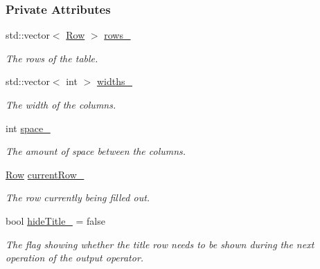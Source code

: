 \subsubsection*{Private Attributes}
\begin{DoxyCompactItemize}
\item 
std\+::vector$<$ \hyperlink{structslb_1_1core_1_1util_1_1Row}{Row} $>$ \hyperlink{structslb_1_1core_1_1util_1_1Table_ae4d50ba6b367af4810accd184260ac55}{rows\+\_\+}\hypertarget{structslb_1_1core_1_1util_1_1Table_ae4d50ba6b367af4810accd184260ac55}{}\label{structslb_1_1core_1_1util_1_1Table_ae4d50ba6b367af4810accd184260ac55}

\begin{DoxyCompactList}\small\item\em The rows of the table. \end{DoxyCompactList}\item 
std\+::vector$<$ int $>$ \hyperlink{structslb_1_1core_1_1util_1_1Table_a852136645dbd416208cc249128ffaf04}{widths\+\_\+}\hypertarget{structslb_1_1core_1_1util_1_1Table_a852136645dbd416208cc249128ffaf04}{}\label{structslb_1_1core_1_1util_1_1Table_a852136645dbd416208cc249128ffaf04}

\begin{DoxyCompactList}\small\item\em The width of the columns. \end{DoxyCompactList}\item 
int \hyperlink{structslb_1_1core_1_1util_1_1Table_a8d94fc5de35c73aa71ba9726ef9a8016}{space\+\_\+}\hypertarget{structslb_1_1core_1_1util_1_1Table_a8d94fc5de35c73aa71ba9726ef9a8016}{}\label{structslb_1_1core_1_1util_1_1Table_a8d94fc5de35c73aa71ba9726ef9a8016}

\begin{DoxyCompactList}\small\item\em The amount of space between the columns. \end{DoxyCompactList}\item 
\hyperlink{structslb_1_1core_1_1util_1_1Row}{Row} \hyperlink{structslb_1_1core_1_1util_1_1Table_adebc405cb17f0110ef9f9453a809cde4}{current\+Row\+\_\+}\hypertarget{structslb_1_1core_1_1util_1_1Table_adebc405cb17f0110ef9f9453a809cde4}{}\label{structslb_1_1core_1_1util_1_1Table_adebc405cb17f0110ef9f9453a809cde4}

\begin{DoxyCompactList}\small\item\em The row currently being filled out. \end{DoxyCompactList}\item 
bool \hyperlink{structslb_1_1core_1_1util_1_1Table_a7f887daafb3aabee26febe14e9186bd7}{hide\+Title\+\_\+} = false\hypertarget{structslb_1_1core_1_1util_1_1Table_a7f887daafb3aabee26febe14e9186bd7}{}\label{structslb_1_1core_1_1util_1_1Table_a7f887daafb3aabee26febe14e9186bd7}

\begin{DoxyCompactList}\small\item\em The flag showing whether the title row needs to be shown during the next operation of the output operator. \end{DoxyCompactList}\end{DoxyCompactItemize}
